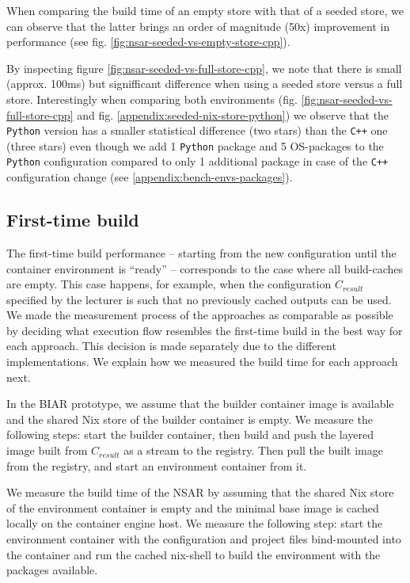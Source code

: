When comparing the build time of an empty store with that of a seeded store, we can observe that the latter brings an order of magnitude (50x) improvement in performance (see fig. \ref{fig:nsar-seeded-vs-empty-store-cpp}). 

By inspecting figure \ref{fig:nsar-seeded-vs-full-store-cpp}, we note that there is small (approx. 100ms) but signifficant difference when using a seeded store versus a full store. Interestingly when comparing both environments (fig. \ref{fig:nsar-seeded-vs-full-store-cpp} and fig. \ref{appendix:seeded-nix-store-python}) we observe that the \verb|Python| version has a smaller statistical difference (two stars) than the \verb|C++| one (three stars) even though we add 1 \verb|Python| package and 5 OS-packages to the \verb|Python| configuration compared to only 1 additional package in case of the \verb|C++| configuration change (see \ref{appendix:bench-envs-packages}). 


\subsection{First-time build}\label{first-time-build}
The first-time build performance -- starting from the new configuration until the container environment is “ready” -- corresponds to the case where all build-caches are empty. This case happens, for example, when the configuration $C_{result}$ specified by the lecturer is such that no previously cached outputs can be used. We made the measurement process of the approaches as comparable as possible by deciding what execution flow resembles the first-time build in the best way for each approach. This decision is made separately due to the different implementations. We explain how we measured the build time for each approach next.

In the BIAR prototype, we assume that the builder container image is available and the shared Nix store of the builder container is empty. We measure the following steps: start the builder container, then build and push the layered image built from $C_{result}$ as a stream to the registry. Then pull the built image from the registry, and start an environment container from it. 

We measure the build time of the NSAR by assuming that the shared Nix store of the environment container is empty and the minimal base image is cached locally on the container engine host. We measure the following step: start the environment container with the configuration and project files bind-mounted into the container and run the cached nix-shell to build the environment with the packages available. 

